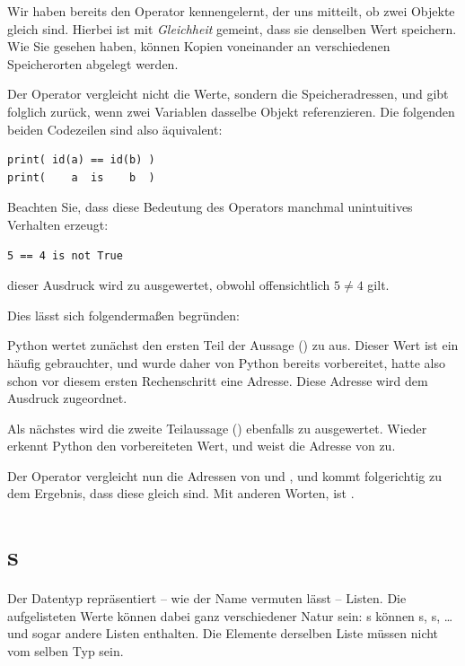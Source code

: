 \begin{hintbox}[Vergleichsoperator \texttt{is} vs. \texttt{==}]
Wir haben bereits den Operator \inPy{==} kennengelernt, der uns mitteilt, ob zwei Objekte gleich sind. Hierbei ist mit \emph{Gleichheit} gemeint, dass sie denselben Wert speichern. Wie Sie gesehen haben, können Kopien voneinander an verschiedenen Speicherorten abgelegt werden.

Der Operator  vergleicht nicht die Werte, sondern die Speicheradressen, und gibt folglich  zurück, wenn zwei Variablen dasselbe Objekt referenzieren. Die folgenden beiden Codezeilen sind also äquivalent:
\begin{codebox}
\begin{verbatim}
print( id(a) == id(b) )
print(    a  is    b  )
\end{verbatim}
\end{codebox}

Beachten Sie, dass diese Bedeutung des Operators  manchmal unintuitives Verhalten erzeugt:
\begin{warnbox}
\begin{verbatim}
5 == 4 is not True
\end{verbatim}
\end{warnbox}
dieser Ausdruck wird zu  ausgewertet, obwohl offensichtlich $5 \neq 4$ gilt.
\end{hintbox}
%
\begin{hintbox}[]
Dies lässt sich folgendermaßen begründen:

Python wertet zunächst den ersten Teil der Aussage () zu  aus. Dieser Wert ist ein häufig gebrauchter, und wurde daher von Python bereits vorbereitet, hatte also schon vor diesem ersten Rechenschritt eine Adresse. Diese Adresse wird dem Ausdruck  zugeordnet.

Als nächstes wird die zweite Teilaussage () ebenfalls zu  ausgewertet. Wieder erkennt Python den vorbereiteten Wert, und weist  die Adresse von  zu.

Der Operator  vergleicht nun die Adressen von  und , und kommt folgerichtig zu dem Ergebnis, dass diese gleich sind. Mit anderen Worten,  ist .
\end{hintbox}


\section{s}
Der Datentyp  repräsentiert -- wie der Name vermuten lässt -- Listen. Die aufgelisteten Werte können dabei ganz verschiedener Natur sein: s können s, s, \ldots und sogar andere Listen enthalten. Die Elemente derselben Liste müssen nicht vom selben Typ sein.

